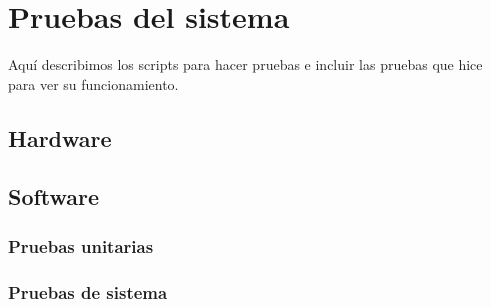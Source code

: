 \chapter{Pruebas del sistema}
Aquí describimos los scripts para hacer pruebas e incluir las pruebas que hice para ver su funcionamiento.

\section{Hardware}


\section{Software}
\subsection{Pruebas unitarias}

\subsection{Pruebas de sistema}
